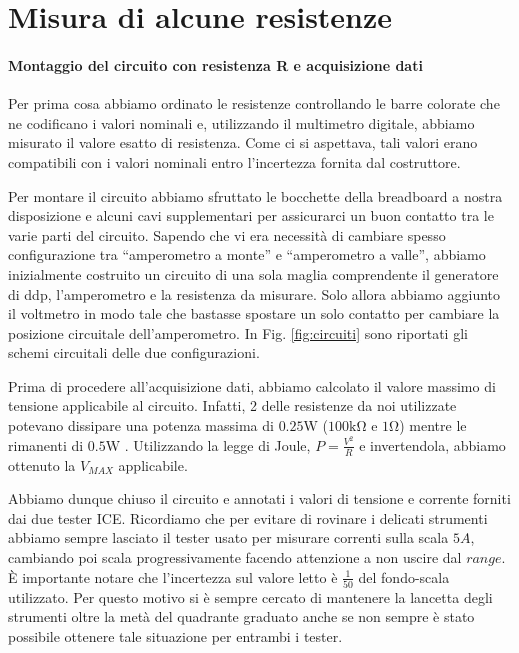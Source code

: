 \section{Misura di alcune resistenze}
\paragraph{Montaggio del circuito con resistenza R e acquisizione dati\\}
Per prima cosa abbiamo ordinato le resistenze controllando le barre colorate che ne codificano  i valori nominali e, utilizzando il multimetro digitale, abbiamo misurato il valore esatto di resistenza. Come ci si aspettava, tali valori erano compatibili con i valori nominali entro l'incertezza fornita dal costruttore.

Per montare il circuito abbiamo sfruttato le bocchette della breadboard a nostra disposizione e alcuni cavi supplementari per assicurarci un buon contatto tra le varie parti del circuito.
Sapendo che vi era necessità di cambiare spesso configurazione tra ``amperometro a monte'' e ``amperometro a valle'', abbiamo inizialmente costruito un circuito di una sola maglia comprendente il generatore di ddp, l'amperometro e la resistenza da misurare. 
Solo allora abbiamo aggiunto il voltmetro in modo tale che bastasse spostare un solo contatto per cambiare la posizione circuitale dell'amperometro. In Fig. \ref{fig:circuiti} sono riportati gli schemi circuitali delle due configurazioni.

Prima di procedere all'acquisizione dati, abbiamo calcolato il valore massimo di tensione applicabile al circuito. Infatti, 2 delle resistenze da noi utilizzate potevano dissipare una potenza massima di $0.25\si{\watt}$  ($100 \si{\kilo\ohm}$ e $1\si{\ohm}$) mentre le rimanenti di $0.5\si{\watt}$ . Utilizzando la legge di Joule, $P=\frac{V^2}{R}$ e invertendola, abbiamo ottenuto la $V_{MAX}$ applicabile. %

Abbiamo dunque chiuso il circuito e annotati i valori di tensione e corrente forniti dai due tester ICE. Ricordiamo che per evitare di rovinare i delicati strumenti abbiamo sempre lasciato il tester usato per misurare correnti sulla scala $5A$, cambiando poi scala progressivamente facendo attenzione a non uscire dal $range$. È importante notare che l'incertezza sul valore letto è $\frac{1}{50}$ del fondo-scala utilizzato. Per questo motivo si è sempre cercato di mantenere la lancetta degli strumenti oltre la metà del quadrante graduato anche se non sempre è stato possibile ottenere tale situazione per entrambi i tester.

